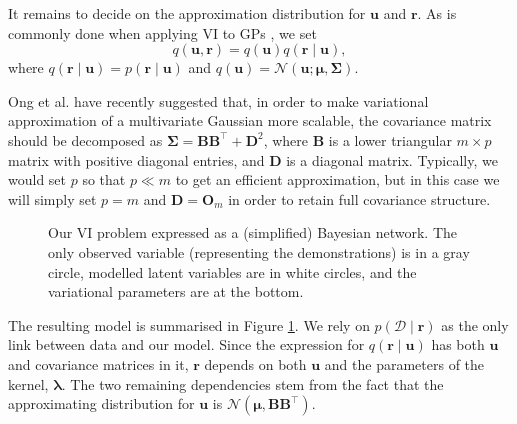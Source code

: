 \documentclass{mpaper}
\newcommand{\approximation}{q(\mathbf{u}, \mathbf{r})}
\begin{document}
It remains to decide on the approximation distribution for $\mathbf{u}$ and
$\mathbf{r}$. As is commonly done when applying VI to GPs
\cite{DBLP:conf/nips/ChengB17}, we set
\begin{equation} \label{eq:approximation}
  \approximation = q(\mathbf{u}) q(\mathbf{r} \mid \mathbf{u}),
\end{equation}
where $q(\mathbf{r} \mid \mathbf{u}) = p(\mathbf{r} \mid \mathbf{u})$ and
$q(\mathbf{u}) = \mathcal{N}(\mathbf{u}; \bm\mu, \bm\Sigma)$.

Ong et al. \cite{ong2018gaussian} have recently suggested that, in order to make
variational approximation of a multivariate Gaussian more scalable, the
covariance matrix should be decomposed as $\bm\Sigma =
\mathbf{B}\mathbf{B}^\intercal + \mathbf{D}^2$, where $\mathbf{B}$ is a lower
triangular $m \times p$ matrix with positive diagonal entries, and $\mathbf{D}$
is a diagonal matrix. Typically, we would set $p$ so that $p \ll m$ to get an
efficient approximation, but in this case we will simply set $p = m$ and
$\mathbf{D} = \mathbf{O}_m$ in order to retain full covariance structure.

\begin{figure}
  \centering
  \caption{Our VI problem expressed as a (simplified)
    Bayesian network. The only observed variable (representing the
    demonstrations) is in a gray circle, modelled latent variables are in white
    circles, and the variational parameters are at the bottom.}
  \label{fig:graphical_model}
\end{figure}

The resulting model is summarised in Figure \ref{fig:graphical_model}. We rely
on $p(\mathcal{D} \mid \mathbf{r})$ as the only link between data and our model.
Since the expression for $q(\mathbf{r} \mid \mathbf{u})$ has both $\mathbf{u}$
and covariance matrices in it, $\mathbf{r}$ depends on both $\mathbf{u}$ and the
parameters of the kernel, $\bm\lambda$. The two remaining dependencies stem from
the fact that the approximating distribution for $\mathbf{u}$ is
$\mathcal{N}(\bm\mu, \mathbf{BB}^\intercal)$.
\end{document}

